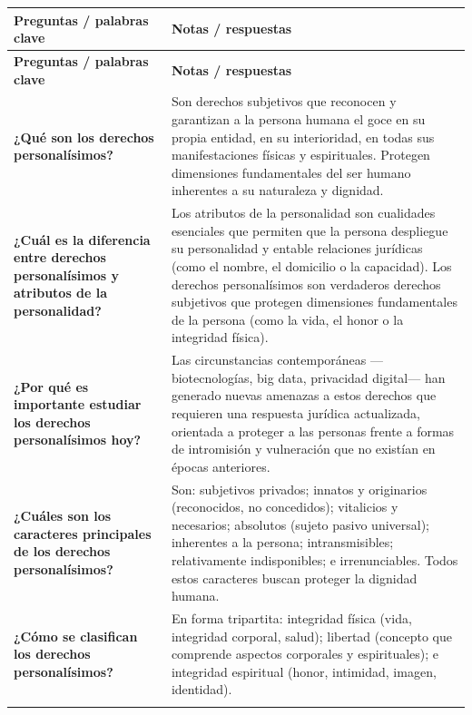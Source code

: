 \documentclass[12pt,oneside]{book}
\begin{document}
\begin{longtable}{
    >{\raggedright\arraybackslash}p{}
    >{\raggedright\arraybackslash}p{}
}
\toprule
\textbf{Preguntas / palabras clave} & \textbf{Notas / respuestas} \\
\midrule
\endfirsthead
\toprule
\textbf{Preguntas / palabras clave} & \textbf{Notas / respuestas} \\
\midrule
\endhead

\textbf{¿Qué son los derechos personalísimos?} &
Son derechos subjetivos que reconocen y garantizan a la persona humana el goce en su propia entidad, en su interioridad, en todas sus manifestaciones físicas y espirituales. Protegen dimensiones fundamentales del ser humano inherentes a su naturaleza y dignidad. \\
\addlinespace

\textbf{¿Cuál es la diferencia entre derechos personalísimos y atributos de la personalidad?} &
Los atributos de la personalidad son cualidades esenciales que permiten que la persona despliegue su personalidad y entable relaciones jurídicas (como el nombre, el domicilio o la capacidad). Los derechos personalísimos son verdaderos derechos subjetivos que protegen dimensiones fundamentales de la persona (como la vida, el honor o la integridad física). \\
\addlinespace

\textbf{¿Por qué es importante estudiar los derechos personalísimos hoy?} &
Las circunstancias contemporáneas ---biotecnologías, big data, privacidad digital--- han generado nuevas amenazas a estos derechos que requieren una respuesta jurídica actualizada, orientada a proteger a las personas frente a formas de intromisión y vulneración que no existían en épocas anteriores. \\
\addlinespace

\textbf{¿Cuáles son los caracteres principales de los derechos personalísimos?} &
Son: subjetivos privados; innatos y originarios (reconocidos, no concedidos); vitalicios y necesarios; absolutos (sujeto pasivo universal); inherentes a la persona; intransmisibles; relativamente indisponibles; e irrenunciables. Todos estos caracteres buscan proteger la dignidad humana. \\
\addlinespace

\textbf{¿Cómo se clasifican los derechos personalísimos?} &
En forma tripartita: integridad física (vida, integridad corporal, salud); libertad (concepto que comprende aspectos corporales y espirituales); e integridad espiritual (honor, intimidad, imagen, identidad). \\
\addlinespace


\end{longtable}
\end{document}
